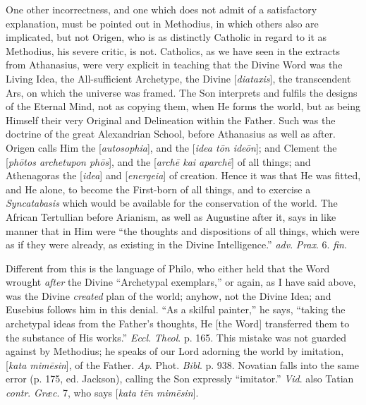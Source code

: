 One other incorrectness, and one which does not admit of a
satisfactory explanation, must be pointed out in Methodius, in which
others also are implicated, but not Origen, who is as distinctly
Catholic in regard to it as Methodius, his severe critic, is not.
Catholics, as we have seen in the extracts from Athanasius, were very
explicit in teaching that the Divine Word was the Living Idea, the
All-sufficient Archetype, the Divine [\emph{diataxis}], the
transcendent Ars, on which the universe was framed. The Son interprets
and fulfils the designs of the Eternal Mind, not as copying them, when
He forms the world, but as being Himself their very Original and
Delineation within the Father. Such was the doctrine of the great
Alexandrian School, before Athanasius as well as after. Origen calls
Him the [\emph{autosophia}], and the [\emph{idea t\={o}n ide\={o}n}];
and Clement the [\emph{ph\={o}tos archetupon ph\={o}s}], and the
[\emph{arch\={e} kai aparch\={e}}] of all things; and
Athenagoras the [\emph{idea}] and [\emph{energeia}] of creation. Hence
it was that He was fitted, and He alone, to become the First-born of
all things, and to exercise a \emph{Syncatabasis} which would be
available for the conservation of the world. The African Tertullian
before Arianism, as well as Augustine after it, says in like manner
that in Him were ``the thoughts and dispositions of all things,
which were as if they were already, as existing in the Divine
Intelligence.'' \emph{adv}. \emph{Prax}. 6. \emph{fin}.

Different from this is the language of Philo, who either held that
the Word wrought \emph{after} the Divine ``Archetypal
exemplars,'' or again, as I have said above, was the Divine \emph{created}
plan of the world; anyhow, not the Divine Idea; and Eusebius follows
him in this denial. ``As a skilful painter,'' he says,
``taking the archetypal ideas from the Father's thoughts, He [the
Word] transferred them to the substance of His works.'' \emph{Eccl}.
\emph{Theol}. p. 165. This mistake was not guarded against by
Methodius; he speaks of our Lord adorning the world by imitation, [\emph{kata
mim\={e}sin}], of the Father. \emph{Ap}. Phot. \emph{Bibl}. p.
938. Novatian falls into the same error (p. 175, ed. Jackson), calling
the Son expressly ``imitator.'' \emph{Vid}. also Tatian \emph{contr}.
\emph{Græc}. 7, who says [\emph{kata t\={e}n mim\={e}sin}].



